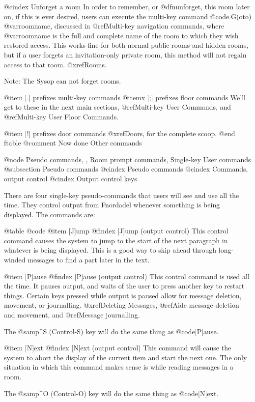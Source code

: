@cindex Unforget a room
In order to remember, or @dfn{unforget}, this room later on, if this is ever
desired, users can execute the multi-key command @code{.G(oto) @var{roomname}},
discussed in @ref{Multi-key navigation commands},
where @var{roomname} is the full and complete
name of the room to which they wish restored access.  This works fine for
both normal public rooms and hidden rooms, but if a user forgets an
invitation-only private room, this method will not regain access to
that room.  @xref{Rooms}.

Note:  The Sysop can not forget rooms.

@item [.] prefixes multi-key commands
@itemx [;] prefixes floor commands
We'll get to these in the next main sections, @ref{Multi-key User Commands},
and @ref{Multi-key User Floor Commands}.

@item [!] prefixes door commands
@xref{Doors}, for the complete scoop.
@end ftable
@comment Now done Other commands

@node Pseudo commands,  , Room prompt commands, Single-key User commands
@subsection Pseudo commands
@cindex Pseudo commands
@cindex Commands, output control
@cindex Output control keys

There are four single-key pseudo-commands that users will see
and use all the time.  They control output from Fnordadel whenever
something is being displayed.  The commands are:

@table @code
@item [J]ump
@findex [J]ump (output control)
This control command causes the system to jump to the
start of the next paragraph in whatever is being displayed.
This is a good way to skip ahead through long-winded messages
to find a part later in the text.

@item [P]ause
@findex [P]ause (output control)
This control command is used all the time.  It pauses
output, and waits of the user to press another key to restart
things.  Certain keys pressed while output is paused allow for
message deletion, movement, or journalling.  @xref{Deleting Messages},
@ref{Aide message deletion and movement}, and @ref{Message journalling}.

The @samp{^S} (Control-S) key will do the same thing as @code{[P]ause}.

@item [N]ext
@findex [N]ext (output control)
This command will cause the system to abort the display
of the current item and start the next one.  The only situation
in which this command makes sense is while reading messages in
a room.

The @samp{^O} (Control-O) key will do the same thing as @code{[N]ext}.

